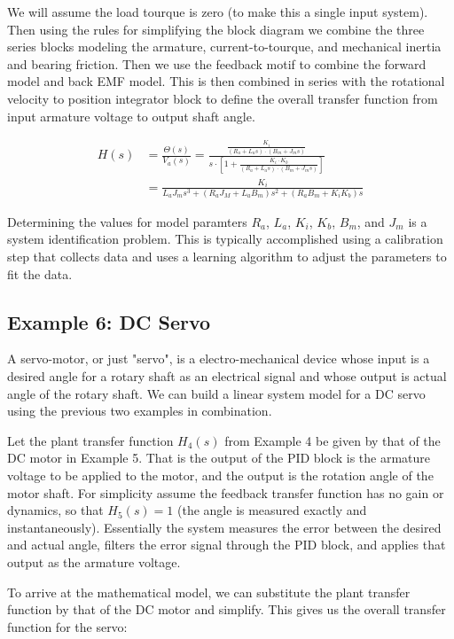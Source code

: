 \documentclass{article}
\begin{document}
We will assume the load tourque is zero (to make this a single input system). Then using the rules for simplifying the block diagram we combine the three series blocks modeling the armature, current-to-tourque, and mechanical inertia and bearing friction. Then we use the feedback motif to combine the forward model and back EMF model. This is then combined in series with the rotational velocity to position integrator block to define the overall transfer function from input armature voltage to output shaft angle.

\begin{align*}
  H(s) &= \frac{\Theta(s)}{V_a(s)} = \frac{\frac{K_i}{\left(R_a + L_a s\right)\cdot \left( B_m + J_m s\right)}}{s \cdot \left[1+\frac{K_i\cdot K_b}{\left(R_a + L_a s\right)\cdot \left( B_m + J_m s\right)}\right]}\\
  &= \frac{K_i}{L_a J_m s^3 + (R_aJ_M + L_a B_m)s^2 + (R_aB_m + K_iK_b)s}
\end{align*}

Determining the values for model paramters $R_a$, $L_a$, $K_i$, $K_b$, $B_m$, and $J_m$ is a system identification problem. This is typically accomplished using a calibration step that collects data and uses a learning algorithm to adjust the parameters to fit the data.  

\subsection{Example 6: DC Servo}

A servo-motor, or just "servo", is a electro-mechanical device whose input is a desired angle for a rotary shaft as an electrical signal and whose output is actual angle of the rotary shaft. We can build a linear system model for a DC servo using the previous two examples in combination.

Let the plant transfer function $H_4(s)$ from Example 4 be given by that of the DC motor in Example 5. That is the output of the PID block is the armature voltage to be applied to the motor, and the output is the rotation angle of the motor shaft. For simplicity assume the feedback transfer function has no gain or dynamics, so that $H_5(s) = 1$ (the angle is measured exactly and instantaneously). Essentially the system measures the error between the desired and actual angle, filters the error signal through the PID block, and applies that output as the armature voltage. 

To arrive at the mathematical model, we can substitute the plant transfer function by that of the DC motor and simplify. This gives us the overall transfer function for the servo:
\end{document}
